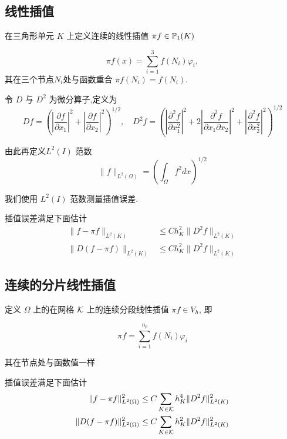 \documentclass{article}
\begin{document}
\subsection{线性插值}

在三角形单元 $K$ 上定义连续的线性插值 $\pi f \in {\mathbb P}_1(K)$ 

\begin{equation}
    \pi f(x) = \sum_{i=1}^{3} f(N_i) \varphi_i,
\end{equation}
其在三个节点$N_i$处与函数重合 $\pi f(N_i) = f(N_i)$.

令 $D$ 与 $D^2$ 为微分算子,定义为
\begin{equation}
D f=\left(\left|\frac{\partial f}{\partial x_{1}}\right|^{2}+\left|\frac{\partial f}{\partial x_{2}}\right|^{2}\right)^{1 / 2}, \quad D^{2} f=\left(\left|\frac{\partial^{2} f}{\partial x_{1}^{2}}\right|^{2}+2\left|\frac{\partial^{2} f}{\partial x_{1} \partial x_{2}}\right|^{2}+\left|\frac{\partial^{2} f}{\partial x_{2}^{2}}\right|^{2}\right)^{1 / 2}
\end{equation}

由此再定义$L^2(I)$ 范数
\begin{equation}
\|f\|_{L^{2}(\Omega)}=\left(\int_{\Omega} f^{2} d x\right)^{1 / 2}
\end{equation}

我们使用 $L^2(I)$ 范数测量插值误差.

\begin{proposition}
    插值误差满足下面估计
    \begin{align*}
        \|f- \pi f\|_{L^2(K)} &\leq 
    C h^2_K \|D^2 f\|_{L^2(K)} \\
        \|D(f - \pi f)\|_{L^2(K)} &\leq
        C h_K^2 \|D^2 f\|_{L^2(K)} 
    \end{align*}
    
\end{proposition}


\subsection{连续的分片线性插值}
定义 $\Omega$ 上的在网格 ${\mathcal K}$ 上的连续分段线性插值 $\pi f\in V_h$, 即

$$
\pi f=\sum_{i=1}^{n_p}f(N_i)\varphi_i
$$

其在节点处与函数值一样

\begin{proposition}
    插值误差满足下面估计
    \begin{align*}
        \|f- \pi f\|^2_{L^2(\Omega)} &\leq 
        C \sum_{K \in {\mathcal K}} h^4_K \|D^2 f\|^2_{L^2(K)} \\
        \|D(f - \pi f)\|^2_{L^2(\Omega)} &\leq
        C \sum_{K \in {\mathcal K}}h_K^2 \|D^2 f\|^2_{L^2(K)} 
    \end{align*}
\end{proposition}
\end{document}
